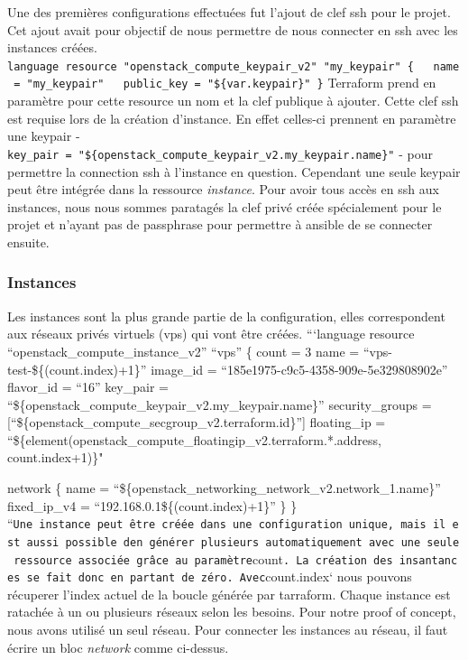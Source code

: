 \documentclass[]{article}
\begin{document}
Une des premières configurations effectuées fut l'ajout de clef ssh pour
le projet. Cet ajout avait pour objectif de nous permettre de nous
connecter en ssh avec les instances créées.
\texttt{language\ resource\ "openstack\_compute\_keypair\_v2"\ "my\_keypair"\ \{\ \ \ name\ =\ "my\_keypair"\ \ \ public\_key\ =\ "\$\{var.keypair\}"\ \}}
Terraform prend en paramètre pour cette resource un nom et la clef
publique à ajouter. Cette clef ssh est requise lors de la création
d'instance. En effet celles-ci prennent en paramètre une keypair -
\texttt{key\_pair\ =\ "\$\{openstack\_compute\_keypair\_v2.my\_keypair.name\}"}
- pour permettre la connection ssh à l'instance en question. Cependant
une seule keypair peut être intégrée dans la ressource \emph{instance}.
Pour avoir tous accès en ssh aux instances, nous nous sommes paratagés
la clef privé créée spécialement pour le projet et n'ayant pas de
passphrase pour permettre à ansible de se connecter ensuite.

\subsubsection{Instances}\label{instances}

Les instances sont la plus grande partie de la configuration, elles
correspondent aux réseaux privés virtuels (vps) qui vont être créées.
```language resource ``openstack\_compute\_instance\_v2'' ``vps'' \{
count = 3 name = ``vps-test-\$\{(count.index)+1\}'' image\_id =
``185e1975-c9c5-4358-909e-5e329808902e'' flavor\_id = ``16'' key\_pair =
``\$\{openstack\_compute\_keypair\_v2.my\_keypair.name\}''
security\_groups =
{[}``\$\{openstack\_compute\_secgroup\_v2.terraform.id\}''{]}
floating\_ip =
``\$\{element(openstack\_compute\_floatingip\_v2.terraform.*.address,
count.index+1)\}"

network \{ name =
``\$\{openstack\_networking\_network\_v2.network\_1.name\}''
fixed\_ip\_v4 = ``192.168.0.1\$\{(count.index)+1\}'' \} \}
``\texttt{Une\ instance\ peut\ être\ créée\ dans\ une\ configuration\ unique,\ mais\ il\ est\ aussi\ possible\ d\textquotesingle{}en\ générer\ plusieurs\ automatiquement\ avec\ une\ seule\ ressource\ associée\ grâce\ au\ paramètre}count\texttt{.\ La\ création\ des\ insantances\ se\ fait\ donc\ en\ partant\ de\ zéro.\ Avec}count.index`
nous pouvons récuperer l'index actuel de la boucle générée par
tarraform. Chaque instance est ratachée à un ou plusieurs réseaux selon
les besoins. Pour notre proof of concept, nous avons utilisé un seul
réseau. Pour connecter les instances au réseau, il faut écrire un bloc
\emph{network} comme ci-dessus.
\end{document}
